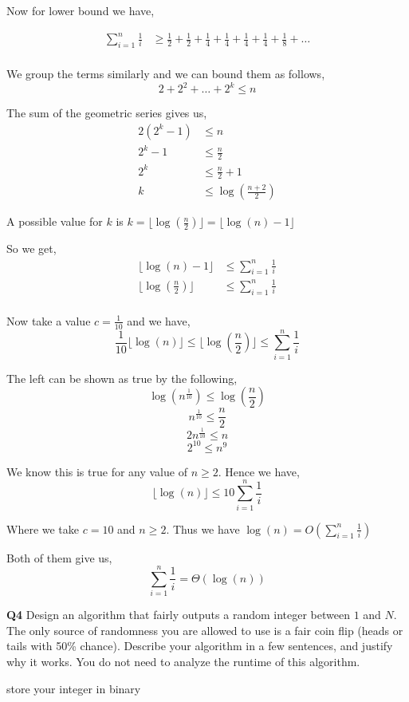 \documentclass[12pt]{article}
\newcommand{\question}[3][Q]{
\begin{description}
\item \textbf{#1{#2}} #3
\end{description}
}
\newcommand{\hint}[1]{{\footnotesize
    \begin{description}
    [leftmargin=3.3em,style=nextline]
        \item[Hint:] {#1}
    \end{description}}   
}
\begin{document}
\begin{answer}
    Now for lower bound we have, 

    \begin{align*}
    \sum_{i = 1}^{n} \frac{1}{i} &\ge \frac{1}{2} + \frac{1}{2} + \frac{1}{4} + \frac{1}{4} + \frac{1}{4} + \frac{1}{4} + \frac{1}{8} + \dots\\
    \end{align*}

    We group the terms similarly and we can bound them as follows, $$ 2 + 2^2 + \dots + 2^{k} \le n $$  

    The sum of the geometric series gives us, 
    \begin{align*}
        2(2^{k} - 1) &\le n\\
        2^{k} - 1 &\le \frac{n}{2}\\
        2^{k} &\le \frac{n}{2} + 1\\
        k &\le \log(\frac{n + 2}{2})
    \end{align*}

    A possible value for $k$ is $k = \lfloor \log(\frac{n}{2}) \rfloor = \lfloor \log(n) - 1 \rfloor$ 

    So we get, 
    \begin{align*}
    \lfloor \log(n) - 1 \rfloor &\le \sum_{i=1}^{n} \frac{1}{i}\\
    \lfloor \log(\frac{n}{2}) \rfloor &\le \sum_{i=1}^{n} \frac{1}{i}\\
    \end{align*}
    

    Now take a value $c = \frac{1}{10}$ and we have, 
    $$ \frac{1}{10}\lfloor \log(n)\rfloor \le \lfloor \log(\frac{n}{2}) \rfloor \le \sum_{i=1}^{n} \frac{1}{i} $$ 

    The left can be shown as true by the following, 
    $$ \log(n^{\frac{1}{10}}) \le \log(\frac{n}{2}) $$ 
    $$ n^{\frac{1}{10}}\le \frac{n}{2} $$ 
    $$ 2n^{\frac{1}{10}} \le n $$ 
    $$ 2^{10} \le n^{9} $$ 

    We know this is true for any value of $n \ge 2$. Hence we have, 
    $$ \lfloor \log(n)\rfloor \le 10 \sum_{i=1}^{n} \frac{1}{i}$$ 

    Where we take $c = 10$ and  $n \ge 2$. Thus we have $\log(n) = O(\sum_{i=1}^{n} \frac{1}{i})$ 

    Both of them give us,  
    $$ \sum_{i=1}^{n} \frac{1}{i} = \Theta(\log(n))$$ 
\end{answer}

\newpage 

\question{4}{
    Design an algorithm that fairly outputs a random integer between $1$ and $N$. The only source of randomness you are allowed to use is a fair coin flip (heads or tails with 50\% chance). Describe your algorithm in a few sentences, and justify why it works. You do not need to analyze the runtime of this algorithm.
        
    \hint{store your integer in binary}
}
\end{document}

